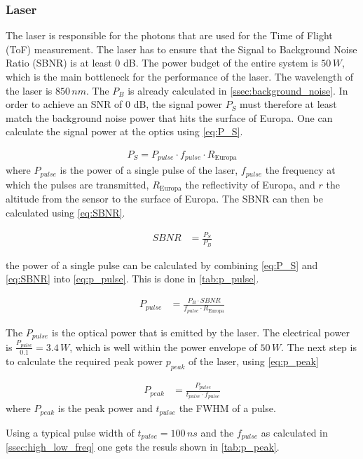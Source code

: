 \subsubsection{Laser}
The laser is responsible for the photons that are used for the Time of Flight (ToF) measurement. The laser has to ensure that the Signal to Background Noise Ratio (SBNR) is at least 0 dB. The power budget of the entire system is $50\,W$, which is the main bottleneck for the performance of the laser. The wavelength of the laser is $850\,nm$. The $P_B$ is already calculated in \cref{ssec:background_noise}. In order to achieve an SNR of 0 dB, the signal power $P_S$ must therefore at least match the background noise power that hits the surface of Europa. One can calculate the signal power at the optics using \cref{eq:P_S}.

\begin{align}\label{eq:P_S}
	P_S = P_{pulse} \cdot f_{pulse} \cdot R_{\text{Europa}}
\end{align}
where $P_{pulse}$ is the power of a single pulse of the laser, $f_{pulse}$ the frequency at which the pulses are transmitted, $R_{\text{Europa}}$ the reflectivity of Europa, and $r$ the altitude from the sensor to the surface of Europa. The SBNR can then be calculated using \cref{eq:SBNR}.

\begin{align}\label{eq:SBNR}
	SBNR &= \frac{P_S}{P_B}
\end{align}

the power of a single pulse can be calculated by combining \cref{eq:P_S} and \cref{eq:SBNR} into \cref{eq:p_pulse}. This is done in \cref{tab:p_pulse}.

\begin{align}
	P_{pulse} &= \frac{P_B\cdot SBNR}{f_{pulse}\cdot R_{\text{Europa}}}
\end{align}



The $P_{pulse}$ is the optical power that is emitted by the laser. The electrical power is $\frac{P_{pulse}}{0.1}=3.4\,W$, which is well within the power envelope of $50\,W$. The next step is to calculate the required peak power $p_{peak}$ of the laser, using \cref{eq:p_peak}

\begin{align}\label{eq:p_peak}
 	P_{peak} &= \frac{P_{pulse}}{t_{pulse} \cdot f_{pulse}}
 \end{align} 
where $P_{peak}$ is the peak power and $t_{pulse}$ the FWHM of a pulse.

Using a typical pulse width of $t_{pulse} = 100\,ns$ and the $f_{pulse}$ as calculated in \cref{ssec:high_low_freq} one gets the resuls shown in \cref{tab:p_peak}.



